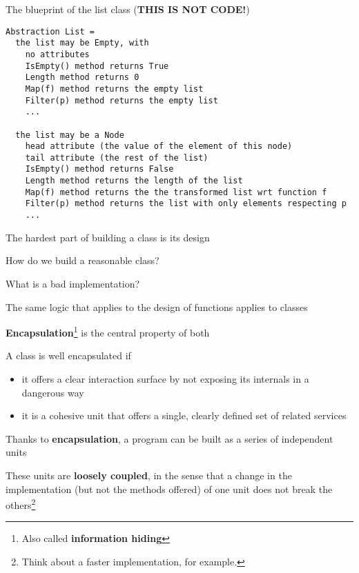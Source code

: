 \documentclass{beamer}
\begin{document}
\begin{frame}[fragile]{The blueprint of the list class (\textbf{THIS IS NOT CODE!})}
\begin{lstlisting}
Abstraction List =
  the list may be Empty, with
    no attributes
    IsEmpty() method returns True
    Length method returns 0
    Map(f) method returns the empty list
    Filter(p) method returns the empty list
    ...
    
  the list may be a Node
    head attribute (the value of the element of this node)
    tail attribute (the rest of the list)
    IsEmpty() method returns False
    Length method returns the length of the list
    Map(f) method returns the the transformed list wrt function f
    Filter(p) method returns the list with only elements respecting p
    ...
\end{lstlisting}
\end{frame}

\begin{slide}{
\item The hardest part of building a class is its design
\item How do we build a reasonable class?
\item What is a bad implementation?
}\end{slide}

\begin{slide}{
\item The same logic that applies to the design of functions applies to classes
\item \textbf{Encapsulation}\footnote{Also called \textbf{information hiding}} is the central property of both
\item A class is well encapsulated if 
\begin{itemize}
\item it offers a clear interaction surface by not exposing its internals in a dangerous way
\item it is a cohesive unit that offers a single, clearly defined set of related services
\end{itemize}
}\end{slide}

\begin{slide}{
\item Thanks to \textbf{encapsulation}, a program can be built as a series of independent units
\item These units are \textbf{loosely coupled}, in the sense that a change in the implementation (but not the methods offered) of one unit does not break the others\footnote{Think about a faster implementation, for example.}
}\end{slide}
\end{document}
